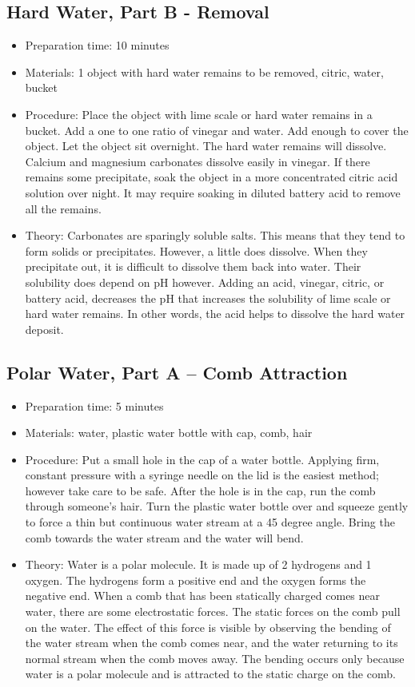 \subsection{Hard Water, Part B - Removal}
\begin{itemize}
\item{Preparation time: 10 minutes}
\item{Materials: 1 object with hard water remains to be removed, citric, water, bucket}
\item{Procedure: Place the object with lime scale or hard water remains in a bucket. Add a one to one ratio of vinegar and water. Add enough to cover the object. Let the object sit overnight. The hard water remains will dissolve. Calcium and magnesium carbonates dissolve easily in vinegar. If there remains some precipitate, soak the object in a more concentrated citric acid solution over night. It may require soaking in diluted battery acid to remove all the remains.}
\item{Theory: Carbonates are sparingly soluble salts. This means that they tend to form solids or precipitates. However, a little does dissolve. When they precipitate out, it is difficult to dissolve them back into water. Their solubility does depend on pH however. Adding an acid, vinegar, citric, or battery acid, decreases the pH that increases the solubility of lime scale or hard water remains. In other words, the acid helps to dissolve the hard water deposit.}
\end{itemize}

\subsection{Polar Water, Part A – Comb Attraction}
\begin{itemize}
\item{Preparation time: 5 minutes}
\item{Materials: water, plastic water bottle with cap, comb, hair}
\item{Procedure: Put a small hole in the cap of a water bottle. Applying firm, constant pressure with a syringe needle on the lid is the easiest method; however take care to be safe. After the hole is in the cap, run the comb through someone’s hair. Turn the plastic water bottle over and squeeze gently to force a thin but continuous water stream at a 45 degree angle. Bring the comb towards the water stream and the water will bend.}
\item{Theory: Water is a polar molecule. It is made up of 2 hydrogens and 1 oxygen. The hydrogens form a positive end and the oxygen forms the negative end. When a comb that has been statically charged comes near water, there are some electrostatic forces. The static forces on the comb pull on the water. The effect of this force is visible by observing the bending of the water stream when the comb comes near, and the water returning to its normal stream when the comb moves away. The bending occurs only because water is a polar molecule and is attracted to the static charge on the comb.}
\end{itemize}


